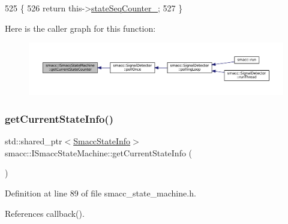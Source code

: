 \begin{DoxyCode}
525   \{
526     \textcolor{keywordflow}{return} this->\hyperlink{classsmacc_1_1ISmaccStateMachine_ab41ee07d20715142e2f7c92d551b2bd6}{stateSeqCounter\_};
527   \}
\end{DoxyCode}
Here is the caller graph for this function\+:
\nopagebreak
\begin{figure}[H]
\begin{center}
\leavevmode
\includegraphics[width=350pt]{classsmacc_1_1ISmaccStateMachine_aad27c0182b53245d0aded22e63cd83bd_icgraph}
\end{center}
\end{figure}
\mbox{\label{classsmacc_1_1ISmaccStateMachine_a4738679e8e5f7adab35e610dce0bfff7}} 
\subsubsection{\texorpdfstring{get\+Current\+State\+Info()}{getCurrentStateInfo()}}
{\footnotesize\ttfamily std\+::shared\+\_\+ptr$<$\hyperlink{classsmacc_1_1introspection_1_1SmaccStateInfo}{Smacc\+State\+Info}$>$ smacc\+::\+I\+Smacc\+State\+Machine\+::get\+Current\+State\+Info (\begin{DoxyParamCaption}{ }\end{DoxyParamCaption})\hspace{0.3cm}{\ttfamily [inline]}}



Definition at line 89 of file smacc\+\_\+state\+\_\+machine.\+h.



References callback().


